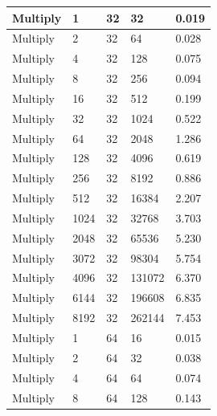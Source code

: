 \documentclass{article}
\begin{document}
\begin{longtable}{|l|l|l|l|l|}
Multiply           & 1    & 32          & 32                & 0.019             \\ \hline
Multiply           & 2    & 32          & 64                & 0.028             \\ \hline
Multiply           & 4    & 32          & 128               & 0.075             \\ \hline
Multiply           & 8    & 32          & 256               & 0.094             \\ \hline
Multiply           & 16   & 32          & 512               & 0.199             \\ \hline
Multiply           & 32   & 32          & 1024              & 0.522             \\ \hline
Multiply           & 64   & 32          & 2048              & 1.286             \\ \hline
Multiply           & 128  & 32          & 4096              & 0.619             \\ \hline
Multiply           & 256  & 32          & 8192              & 0.886             \\ \hline
Multiply           & 512  & 32          & 16384             & 2.207             \\ \hline
Multiply           & 1024 & 32          & 32768             & 3.703             \\ \hline
Multiply           & 2048 & 32          & 65536             & 5.230             \\ \hline
Multiply           & 3072 & 32          & 98304             & 5.754             \\ \hline
Multiply           & 4096 & 32          & 131072            & 6.370             \\ \hline
Multiply           & 6144 & 32          & 196608            & 6.835             \\ \hline
Multiply           & 8192 & 32          & 262144            & 7.453             \\ \hline
Multiply           & 1    & 64          & 16                & 0.015             \\ \hline
Multiply           & 2    & 64          & 32                & 0.038             \\ \hline
Multiply           & 4    & 64          & 64                & 0.074             \\ \hline
Multiply           & 8    & 64          & 128               & 0.143             \\ \hline

\end{longtable}
\end{document}
